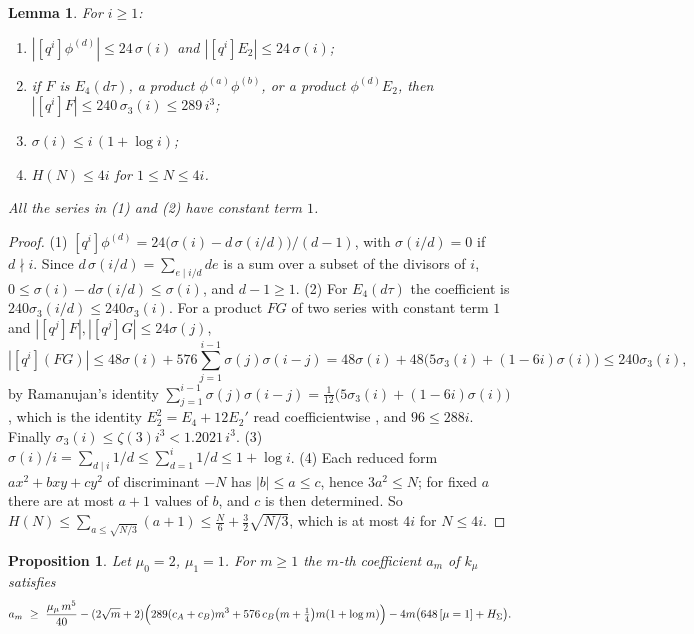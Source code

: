\documentclass[11pt]{amsart}
\newtheorem{proposition}[theorem]{Proposition}
\newtheorem{lemma}[theorem]{Lemma}
\theoremstyle{definition}
\begin{document}
\begin{lemma}\label{lem:coeffs}
For $i\ge1$:
\begin{enumerate}
\item $|[q^i]\phi^{(d)}|\le24\,\sigma(i)$ and $|[q^i]E_2|\le24\,\sigma(i)$;
\item if $F$ is $E_4(d\tau)$, a product $\phi^{(a)}\phi^{(b)}$, or a product $\phi^{(d)}E_2$, then $|[q^i]F|\le240\,\sigma_3(i)\le289\,i^3$;
\item $\sigma(i)\le i\,(1+\log i)$;
\item $H(N)\le 4i$ for $1\le N\le 4i$.
\end{enumerate}
All the series in (1) and (2) have constant term $1$.
\end{lemma}

\begin{proof}
(1) $[q^i]\phi^{(d)}=24\bigl(\sigma(i)-d\,\sigma(i/d)\bigr)/(d-1)$, with $\sigma(i/d)=0$ if $d\nmid i$. Since $d\,\sigma(i/d)=\sum_{e\mid i/d}de$ is a sum over a subset of the divisors of $i$, $0\le\sigma(i)-d\sigma(i/d)\le\sigma(i)$, and $d-1\ge1$.
(2) For $E_4(d\tau)$ the coefficient is $240\sigma_3(i/d)\le240\sigma_3(i)$. For a product $FG$ of two series with constant term $1$ and $|[q^j]F|,|[q^j]G|\le24\sigma(j)$,
\[
|[q^i](FG)|\le48\sigma(i)+576\sum_{j=1}^{i-1}\sigma(j)\sigma(i-j)=48\sigma(i)+48\bigl(5\sigma_3(i)+(1-6i)\sigma(i)\bigr)\le240\sigma_3(i),
\]
by Ramanujan's identity $\sum_{j=1}^{i-1}\sigma(j)\sigma(i-j)=\frac1{12}\bigl(5\sigma_3(i)+(1-6i)\sigma(i)\bigr)$, which is the identity $E_2^2=E_4+12E_2'$ read coefficientwise \cite{Zag08}, and $96\le288i$. Finally $\sigma_3(i)\le\zeta(3)i^3<1.2021\,i^3$.
(3) $\sigma(i)/i=\sum_{d\mid i}1/d\le\sum_{d=1}^i1/d\le1+\log i$.
(4) Each reduced form $ax^2+bxy+cy^2$ of discriminant $-N$ has $|b|\le a\le c$, hence $3a^2\le N$; for fixed $a$ there are at most $a+1$ values of $b$, and $c$ is then determined. So $H(N)\le\sum_{a\le\sqrt{N/3}}(a+1)\le\frac N6+\frac32\sqrt{N/3}$, which is at most $4i$ for $N\le4i$.
\end{proof}

\begin{proposition}\label{prop:large}
Let $\mu_0=2$, $\mu_1=1$. For $m\ge1$ the $m$-th coefficient $a_m$ of $k_\mu$ satisfies
\[
a_m\ \ge\ \frac{\mu_\mu\,m^5}{40}-(2\sqrt m+2)\Bigl(289(c_A+c_B)m^3+576\,c_B\bigl(m+\tfrac14\bigr)m(1+\log m)\Bigr)-4m\bigl(648\,[\mu=1]+H_\Sigma\bigr).
\]
\end{proposition}
\end{document}

